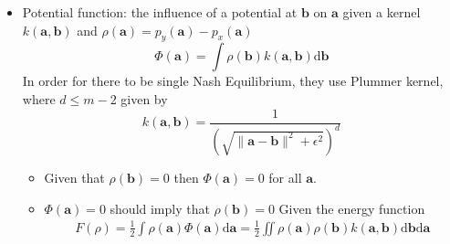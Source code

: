 \begin{itemize}
    \item Potential function: the influence of a potential at $\boldsymbol{b}$ on $\boldsymbol{a}$ given a kernel $k(\boldsymbol{a},\boldsymbol{b})$ and $\rho(\boldsymbol{a})=p_{y}(\boldsymbol{a})-p_{x}(\boldsymbol{a})$
    $$
\Phi(\boldsymbol{a})=\int \rho(\boldsymbol{b}) k(\boldsymbol{a}, \boldsymbol{b}) \mathrm{d} \boldsymbol{b}
$$
    In order for there to be single Nash Equilibrium, they use Plummer kernel, where $d \leq m- 2$ given by 
    $$
k(\boldsymbol{a}, \boldsymbol{b})=\frac{1}{\left(\sqrt{\|\boldsymbol{a}-\boldsymbol{b}\|^{2}+\epsilon^{2}}\right)^{d}}
$$
    \begin{itemize}
        \item Given that $\rho(\boldsymbol{b}) = 0$ then $\Phi(\boldsymbol{a}) = 0$ for all $\boldsymbol{a}$.
        \item $\Phi(\boldsymbol{a}) = 0$ should imply that $\rho(\boldsymbol{b}) = 0$ Given the energy function
 \begin{equation*}
     \begin{aligned}
     F(\rho)= \frac{1}{2} \int \rho(\boldsymbol{a}) \Phi(\boldsymbol{a}) \mathrm{d} \boldsymbol{a}  =\frac{1}{2} \iint \rho(\boldsymbol{a}) \rho(\boldsymbol{b}) k(\boldsymbol{a}, \boldsymbol{b}) \mathrm{d} \boldsymbol{b} \mathrm{d} \boldsymbol{a}
     \end{aligned}{}
 \end{equation*}{}


\end{itemize}
\end{itemize}
